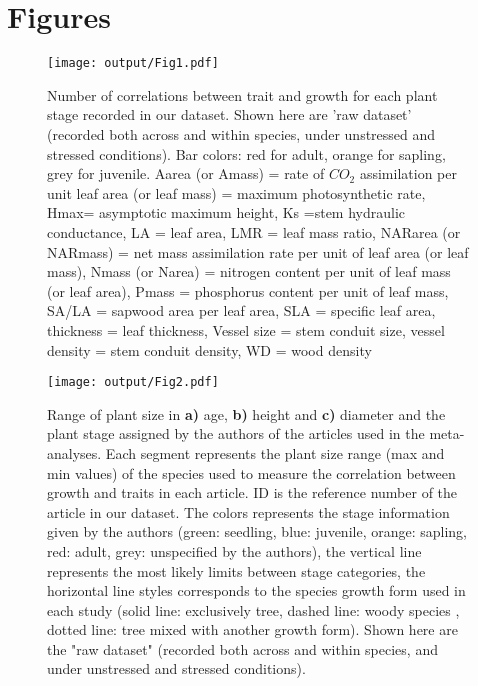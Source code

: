 \documentclass[a4paper]{article}\usepackage[]{graphicx}\usepackage[]{color}
\begin{document}
\clearpage
\linespread{1}

\nocite{*}
 
\label{references}


\clearpage
\section*{Figures}

\begin{figure}[h!]
\centering
\texttt{[image: output/Fig1.pdf]}
\caption{Number of correlations between trait and growth for each plant stage recorded in our dataset. Shown here are 'raw dataset' (recorded both across and within species, under unstressed and stressed conditions). Bar colors: red for adult, orange for sapling, grey for juvenile. Aarea (or Amass) = rate of $CO_{2}$ assimilation per unit leaf area (or leaf mass) = maximum photosynthetic rate, Hmax= asymptotic maximum height,  Ks =stem hydraulic conductance, LA = leaf area, LMR = leaf mass ratio, NARarea (or NARmass) = net mass assimilation rate per unit of leaf area (or leaf mass), Nmass (or Narea) = nitrogen content per unit of leaf mass (or leaf area), Pmass = phosphorus content per unit of leaf mass, SA/LA = sapwood area per leaf area, SLA = specific leaf area, thickness = leaf thickness, Vessel size = stem conduit size, vessel density = stem conduit density, WD = wood density}
\label{Fig1}
\end{figure}

\begin{figure}[h!]
\centering
\texttt{[image: output/Fig2.pdf]}
\caption{Range of plant size in \textbf{a)} age, \textbf{b)} height and \textbf{c)} diameter and the plant stage assigned by the authors of the articles used in the meta-analyses. Each segment represents the plant size range (max and min values) of the species used to measure the correlation between growth and traits in each article. ID is the reference number of the article in our dataset. The colors represents the stage information given by the authors (green: seedling, blue: juvenile, orange: sapling, red: adult, grey: unspecified by the authors), the vertical line represents the most likely limits between stage categories, the horizontal line styles corresponds to the species growth form used in each study (solid line: exclusively tree, dashed line: woody species , dotted line: tree mixed with another growth form). Shown here are the "raw dataset" (recorded both across and within species, and under unstressed and stressed conditions).}
\label{Fig2}
\end{figure}
\end{document}

